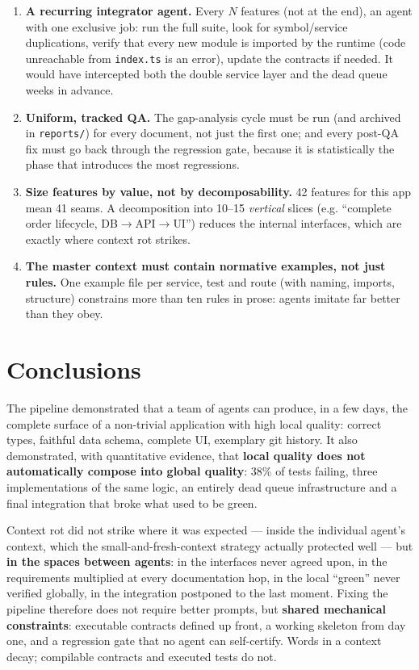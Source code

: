 \documentclass[11pt,a4paper]{article}
\newcommand{\file}[1]{\texttt{\small #1}}
\begin{document}
\begin{enumerate}[leftmargin=1.8em]
  \item \textbf{A recurring integrator agent.} Every $N$ features (not at the end), an agent with one exclusive job: run the full suite, look for symbol/service duplications, verify that every new module is imported by the runtime (code unreachable from \file{index.ts} is an error), update the contracts if needed. It would have intercepted both the double service layer and the dead queue weeks in advance.

  \item \textbf{Uniform, tracked QA.} The gap-analysis cycle must be run (and archived in \file{reports/}) for every document, not just the first one; and every post-QA fix must go back through the regression gate, because it is statistically the phase that introduces the most regressions.

  \item \textbf{Size features by value, not by decomposability.} 42 features for this app mean 41 seams. A decomposition into 10--15 \emph{vertical} slices (e.g. ``complete order lifecycle, DB$\to$API$\to$UI'') reduces the internal interfaces, which are exactly where context rot strikes.

  \item \textbf{The master context must contain normative examples, not just rules.} One example file per service, test and route (with naming, imports, structure) constrains more than ten rules in prose: agents imitate far better than they obey.
\end{enumerate}

\section{Conclusions}

The pipeline demonstrated that a team of agents can produce, in a few days, the complete surface of a non-trivial application with high local quality: correct types, faithful data schema, complete UI, exemplary git history. It also demonstrated, with quantitative evidence, that \textbf{local quality does not automatically compose into global quality}: 38\% of tests failing, three implementations of the same logic, an entirely dead queue infrastructure and a final integration that broke what used to be green.

Context rot did not strike where it was expected --- inside the individual agent's context, which the small-and-fresh-context strategy actually protected well --- but \textbf{in the spaces between agents}: in the interfaces never agreed upon, in the requirements multiplied at every documentation hop, in the local ``green'' never verified globally, in the integration postponed to the last moment. Fixing the pipeline therefore does not require better prompts, but \textbf{shared mechanical constraints}: executable contracts defined up front, a working skeleton from day one, and a regression gate that no agent can self-certify. Words in a context decay; compilable contracts and executed tests do not.
\end{document}
